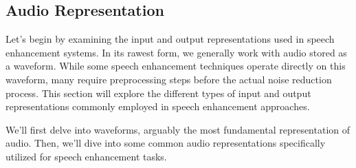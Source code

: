 \subsection{Audio Representation \cite{manilow2020}}
Let's begin by examining the input and output representations used in speech enhancement systems. In its rawest form, we generally work with audio stored as a waveform. While some speech enhancement techniques operate directly on this waveform, many require preprocessing steps before the actual noise reduction process. This section will explore the different types of input and output representations commonly employed in speech enhancement approaches.

We'll first delve into waveforms, arguably the most fundamental representation of audio. Then, we'll dive into some common audio representations specifically utilized for speech enhancement tasks.



